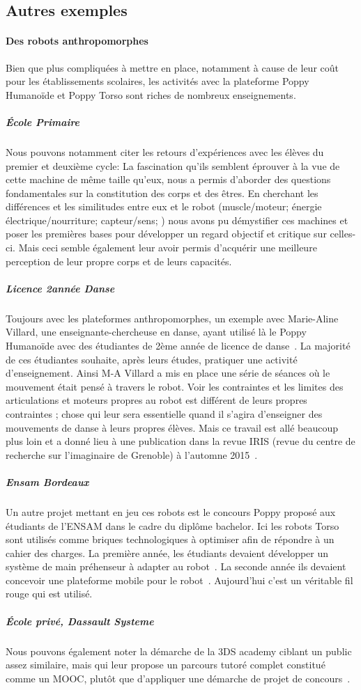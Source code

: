     \subsection{Autres exemples}
        \paragraph[Des robots anthropomorphes]{Des robots anthropomorphes}
            Bien que plus compliquées à mettre en place, notamment à cause de leur coût pour les établissements scolaires, les activités avec la plateforme Poppy Humanoïde et Poppy Torso sont riches de nombreux enseignements.
            \subparagraph{École Primaire}
                Nous pouvons notamment citer les retours d'expériences avec les élèves du premier et deuxième cycle:  La fascination qu'ils semblent éprouver à la vue de cette machine de même taille qu'eux, nous a permis d'aborder des questions fondamentales sur la constitution des corps et des êtres. En cherchant les différences et les similitudes entre eux et le robot (muscle/moteur; énergie électrique/nourriture; capteur/sens; \etc) nous avons pu démystifier ces machines et poser les premières bases pour développer un regard objectif et critique sur celles-ci. Mais ceci semble également leur avoir permis d'acquérir une meilleure perception de leur propre corps et de leurs capacités.
            \subparagraph{Licence 2\ieme année Danse}\label{sec:villard_cours}
                Toujours avec les plateformes anthropomorphes, un exemple avec Marie-Aline Villard, une enseignante-chercheuse en danse, ayant utilisé là le Poppy Humanoïde avec des étudiantes de 2ème année de licence de danse~. La majorité de ces étudiantes souhaite, après leurs études, pratiquer une activité d'enseignement. Ainsi M-A Villard a mis en place une série de séances où le mouvement était pensé à travers le robot. Voir les contraintes et les limites des articulations et moteurs propres au robot est différent de leurs propres contraintes  ; chose qui leur sera essentielle quand il s'agira d'enseigner des mouvements de danse à leurs propres élèves. Mais ce travail est allé beaucoup plus loin et a donné lieu à une publication dans la revue IRIS (revue du centre de recherche sur l'imaginaire de Grenoble) à l'automne 2015~.
            \subparagraph{Ensam Bordeaux}
                Un autre projet mettant en jeu ces robots est le concours Poppy proposé aux étudiants de l'ENSAM dans le cadre du diplôme bachelor. Ici les robots Torso sont utilisés comme briques technologiques à optimiser afin de répondre à un cahier des charges. La première année, les étudiants devaient développer un système de main préhenseur à adapter au robot~. La seconde année ils devaient concevoir une plateforme mobile pour le robot~. Aujourd'hui c'est un véritable fil rouge qui est utilisé.
            \subparagraph{École privé, Dassault Systeme}
                Nous pouvons également noter la démarche de la 3DS academy ciblant un public assez similaire, mais qui leur propose un parcours tutoré complet constitué comme un MOOC, plutôt que d'appliquer une démarche de projet \etou de concours~.
